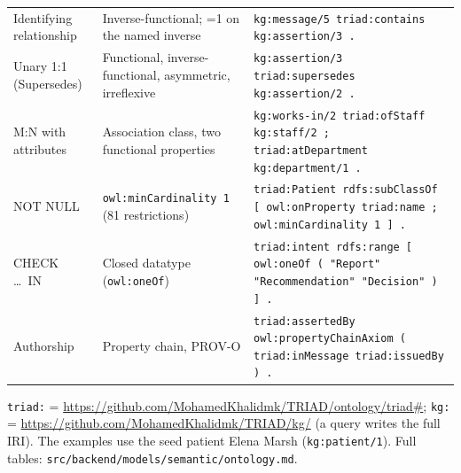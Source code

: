 \documentclass[sigconf]{acmart}
\newcommand{\tw}[1]{\texttt{#1}}
\begin{document}
\begin{minipage}[t]{.81\textwidth}
\begin{tabularx}{\linewidth}{@{}>{\raggedright\arraybackslash}p{.17\linewidth}>{\raggedright\arraybackslash}p{.25\linewidth}>{\raggedright\arraybackslash}X@{}}
Identifying relationship & Inverse-functional; =1 on the named inverse & \tw{kg:message/5 triad:contains kg:assertion/3 .}\\
Unary 1:1 (Supersedes) & Functional, inverse-functional, asymmetric, irreflexive & \tw{kg:assertion/3 triad:supersedes kg:assertion/2 .}\\
M:N with attributes & Association class, two functional properties & \tw{kg:works-in/2 triad:ofStaff kg:staff/2 ; triad:atDepartment kg:department/1 .}\\
NOT NULL & \tw{owl:minCardinality 1} (81 restrictions) & \tw{triad:Patient rdfs:subClassOf [ owl:onProperty triad:name ; owl:minCardinality 1 ] .}\\
CHECK \dots\ IN & Closed datatype (\tw{owl:oneOf}) & \tw{triad:intent rdfs:range [ owl:oneOf ( "Report" "Recommendation" "Decision" ) ] .}\\
Authorship & Property chain, PROV-O & \tw{triad:assertedBy owl:propertyChainAxiom ( triad:inMessage triad:issuedBy ) .}\\
\bottomrule
\end{tabularx}

\medskip
\noindent\tw{triad:} = \url{https://github.com/MohamedKhalidmk/TRIAD/ontology/triad\#}; \tw{kg:} = \url{https://github.com/MohamedKhalidmk/TRIAD/kg/} (a query writes the full IRI). The examples use the seed patient Elena Marsh (\tw{kg:patient/1}). Full tables: \tw{src/backend/models/semantic/ontology.md}.
\end{minipage}
\end{document}
